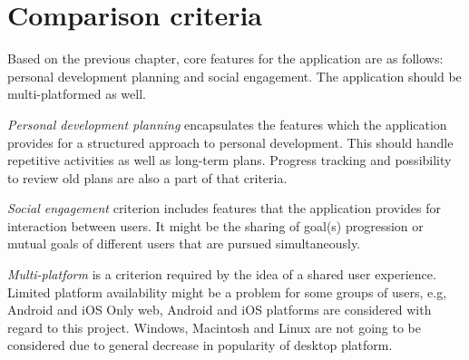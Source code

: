 
\section{Comparison criteria}\label{sec:comparison-criteria}



Based on the previous chapter, core features for the application are as follows: personal development planning and social engagement.
The application should be multi-platformed as well.

\textit{Personal development planning} encapsulates the features which the application provides for a structured approach to personal development.
This should handle repetitive activities as well as long-term plans.
Progress tracking and possibility to review old plans are also a part of that criteria.

\textit{Social engagement} criterion includes features that the application provides for interaction between users.
It might be the sharing of goal(s) progression or mutual goals of different users that are pursued simultaneously.

\textit{Multi-platform} is a criterion required by the idea of a shared user experience.
Limited platform availability might be a problem for some groups of users, e.g, Android and iOS\@
Only web, Android and iOS platforms are considered with regard to this project.
Windows, Macintosh and Linux are not going to be considered due to general decrease in popularity of desktop platform.\cite{mobile-vs-desktop}


